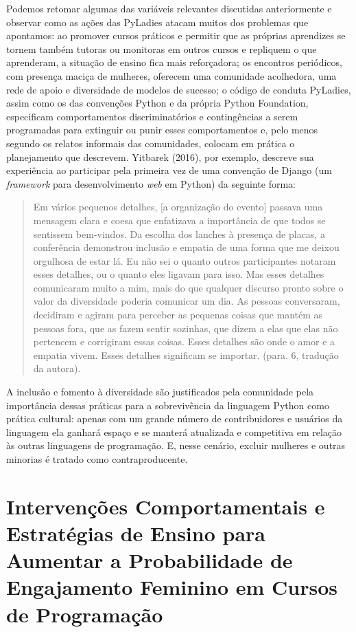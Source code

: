 Podemos retomar algumas das variáveis relevantes discutidas anteriormente e observar como as ações das PyLadies atacam muitos dos problemas que apontamos: ao promover cursos práticos e permitir que as próprias aprendizes se tornem também tutoras ou monitoras em outros cursos e repliquem o que aprenderam, a situação de ensino fica mais reforçadora; os encontros periódicos, com presença maciça de mulheres, oferecem uma comunidade acolhedora, uma rede de apoio e  diversidade de modelos de sucesso; o código de conduta PyLadies, assim como os das convenções Python e da própria Python Foundation, especificam comportamentos discriminatórios e contingências a serem programadas para extinguir ou punir esses comportamentos e, pelo menos segundo os relatos informais das comunidades, colocam em prática o planejamento que descrevem. Yitbarek (2016), por exemplo, descreve sua experiência ao participar pela primeira vez de uma convenção de Django (um \textit{framework} para desenvolvimento \textit{web} em Python) da seguinte forma:

\begin{quote}
    Em vários pequenos detalhes, [a organização do evento] passava uma mensagem clara e coesa que enfatizava a importância de que todos se sentissem bem-vindos. Da escolha dos lanches à presença de placas, a conferência demonstrou inclusão e empatia de uma forma que me deixou orgulhosa de estar lá. Eu não sei o quanto outros participantes notaram esses detalhes, ou o quanto eles ligavam para isso. Mas esses detalhes comunicaram muito a mim, mais do que qualquer discurso pronto sobre o valor da diversidade poderia comunicar um dia. As pessoas conversaram, decidiram e agiram para perceber as pequenas coisas que mantém as pessoas fora, que as fazem sentir sozinhas, que dizem a elas que elas não pertencem e corrigiram essas coisas. Esses detalhes são onde o amor e a empatia vivem. Esses detalhes significam se importar. (para. 6, tradução da autora).
\end{quote}

A inclusão e fomento à diversidade são justificados pela comunidade pela importância dessas práticas para a sobrevivência da linguagem Python como prática cultural: apenas com um grande número de contribuidores e usuários da linguagem ela ganhará espaço e se manterá atualizada e competitiva em relação às outras linguagens de programação. E, nesse cenário, excluir mulheres e outras minorias é tratado como contraproducente.

\section{Intervenções Comportamentais e Estratégias de Ensino para Aumentar a Probabilidade de Engajamento Feminino em Cursos de Programação}

